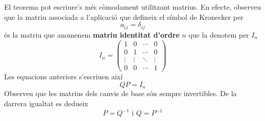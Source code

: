 \begin{observacio}
El teorema pot escriure’s més còmodament utilitzant matrius. En
efecte, observeu que la matriu associada a l’aplicació que defineix
el símbol de Kronecker per 
\begin{equation*}
a_{ij}=\delta _{ij}
\end{equation*}%
és la matriu que anomenem \textbf{matriu identitat d’ordre} $n$ que la
denotem per $I_{n}$ 
\begin{equation*}
I_{n}=\left( 
\begin{array}{cccc}
1 & 0 & \cdots & 0 \\ 
0 & 1 & \cdots & 0 \\ 
\vdots & \vdots & \ddots & \vdots \\ 
0 & 0 & \cdots & 1%
\end{array}%
\right)
\end{equation*}%
Les equacions anteriors s’escriuen així 
\begin{equation*}
QP=I_{n}
\end{equation*}%
Observeu que les matrius dels canvis de base són sempre
invertibles. De la darrera igualtat es dedueix 
\begin{equation*}
P=Q^{-1}\text{ \ \ \ \ i \ \ \ \ \ }Q=P^{-1}
\end{equation*}
\end{observacio}

